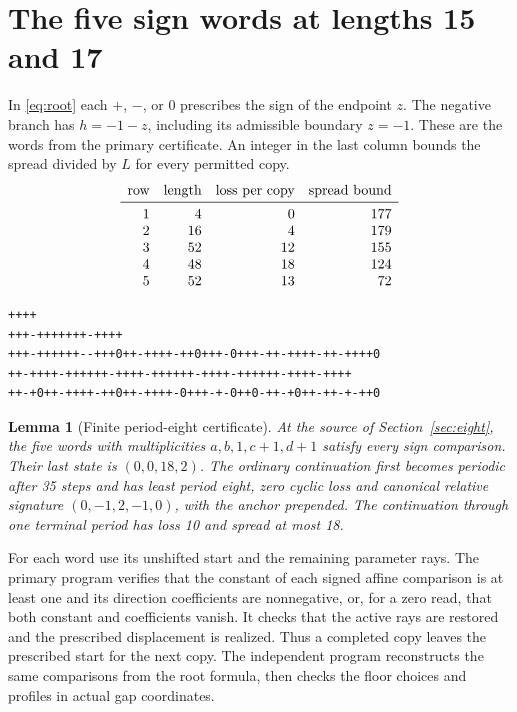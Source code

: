 \documentclass[11pt,reqno]{amsart}
\newtheorem{lemma}[theorem]{Lemma}
\theoremstyle{remark}
\begin{document}
\appendix
\section{The five sign words at lengths 15 and 17}\label{app:eight}

In \eqref{eq:root} each \(+\), \(-\), or \(0\) prescribes the sign
of the endpoint \(z\). The negative branch has \(h=-1-z\),
including its admissible boundary \(z=-1\). These are the words
from the primary certificate. An integer in the last column
bounds the spread divided by \(L\) for every permitted copy.
\[
\begin{array}{rrrr}
\text{row} & \text{length} & \text{loss per copy} & \text{spread bound}\\
\midrule
1 & 4 & 0 & 177\\
2 & 16 & 4 & 179\\
3 & 52 & 12 & 155\\
4 & 48 & 18 & 124\\
5 & 52 & 13 & 72
\end{array}
\]
{\small
\begin{verbatim}
++++
+++-+++++++-++++
+++-++++++--+++0++-++++-++0+++-0+++-++-++++-++-++++0
++-++++-++++++-++++-++++++-++++-++++++-++++-++++
++-+0++-++++-++0++-++++-0+++-+-0++0-++-+0++-++-+-++0
\end{verbatim}
}

\begin{lemma}[Finite period-eight certificate]\label{lem:comp8}
At the source of Section~\ref{sec:eight}, the five words with
multiplicities \(a,b,1,c+1,d+1\) satisfy every sign comparison.
Their last state is \((0,0,18,2)\).
The ordinary continuation first becomes periodic after 35 steps
and has least period eight, zero cyclic loss and canonical
relative signature \((0,-1,2,-1,0)\), with the anchor prepended.
The continuation through one terminal period has loss 10 and
spread at most 18.
\end{lemma}

For each word use its unshifted start and the remaining parameter
rays. The primary program verifies that the constant of each
signed affine comparison is at least one and its direction
coefficients are nonnegative, or, for a zero read, that
both constant and coefficients vanish. It checks that the active
rays are restored and the prescribed displacement is realized.
Thus a completed copy leaves the prescribed start for the next
copy. The independent program reconstructs the same comparisons
from the root formula, then checks the floor choices and
profiles in actual gap coordinates.
\end{document}
